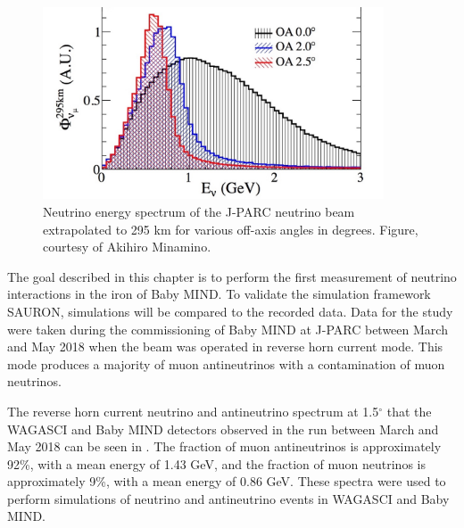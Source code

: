 \begin{figure}[h!]
\centering
\includegraphics[width=0.9\textwidth]{figures/NeutrinoChap/offAxisFlux.jpeg}
\caption{Neutrino energy spectrum of the J-PARC neutrino beam extrapolated to 295 km for various off-axis angles in degrees. Figure, courtesy of Akihiro Minamino.}
\label{fig:T2KAxis2}
\end{figure}



The goal described in this chapter is to perform the first measurement of neutrino interactions in the iron of Baby MIND. To validate the simulation framework SAURON, simulations will be compared to the recorded data. Data for the study were taken during the commissioning of Baby MIND at J-PARC between March and May 2018 when the beam was operated in reverse horn current mode. This mode produces a majority of muon antineutrinos with a contamination of muon neutrinos.

The reverse horn current neutrino and antineutrino spectrum at 1.5$^\circ$ that the WAGASCI and Baby MIND detectors observed in the run between March and May 2018 can be seen in . The fraction of muon antineutrinos is approximately 92\%, with a mean energy of 1.43 GeV, and the fraction of muon neutrinos is approximately 9\%, with a mean energy of 0.86 GeV. These spectra were used to perform simulations of neutrino and antineutrino events in WAGASCI and Baby MIND.

